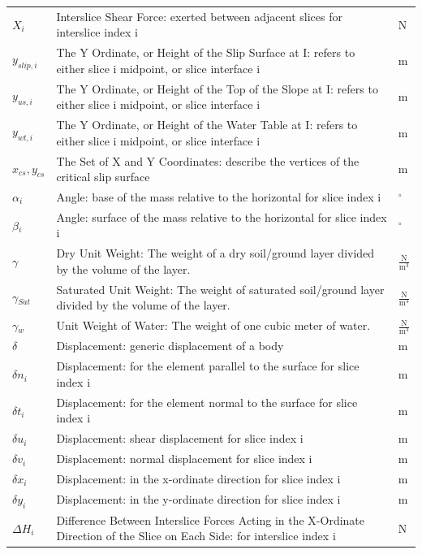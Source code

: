 \documentclass[12pt]{article}
\begin{document}
\begin{longtable*}{l l l}
\\
$X_{i}$ & Interslice Shear Force: exerted between adjacent slices for interslice index i & N
\\
$y_{slip,i}$ & The Y Ordinate, or Height of the Slip Surface at I: refers to either slice i midpoint, or slice interface i & m
\\
$y_{us,i}$ & The Y Ordinate, or Height of the Top of the Slope at I: refers to either slice i midpoint, or slice interface i & m
\\
$y_{wt,i}$ & The Y Ordinate, or Height of the Water Table at I: refers to either slice i midpoint, or slice interface i & m
\\
${x_{cs},y_{cs}}$ & The Set of X and Y Coordinates: describe the vertices of the critical slip surface & m
\\
$\alpha{}_{i}$ & Angle: base of the mass relative to the horizontal for slice index i & ${}^{\circ}$
\\
$\beta{}_{i}$ & Angle: surface of the mass relative to the horizontal for slice index i & ${}^{\circ}$
\\
$\gamma{}$ & Dry Unit Weight: The weight of a dry soil/ground layer divided by the volume of the layer. & $\frac{\text{N}}{\text{m}^{3}}$
\\
$\gamma{}_{Sat}$ & Saturated Unit Weight: The weight of saturated soil/ground layer divided by the volume of the layer. & $\frac{\text{N}}{\text{m}^{3}}$
\\
$\gamma{}_{w}$ & Unit Weight of Water: The weight of one cubic meter of water. & $\frac{\text{N}}{\text{m}^{3}}$
\\
$\delta{}$ & Displacement: generic displacement of a body & m
\\
$\delta{}n_{i}$ & Displacement: for the element parallel to the surface for slice index i & m
\\
$\delta{}t_{i}$ & Displacement: for the element normal to the surface for slice index i & m
\\
$\delta{}u_{i}$ & Displacement: shear displacement for slice index i & m
\\
$\delta{}v_{i}$ & Displacement: normal displacement for slice index i & m
\\
$\delta{}x_{i}$ & Displacement: in the x-ordinate direction for slice index i & m
\\
$\delta{}y_{i}$ & Displacement: in the y-ordinate direction for slice index i & m
\\
$\Delta{}H_{i}$ & Difference Between Interslice Forces Acting in the X-Ordinate Direction of the Slice on Each Side: for interslice index i & N

\end{longtable*}
\end{document}
